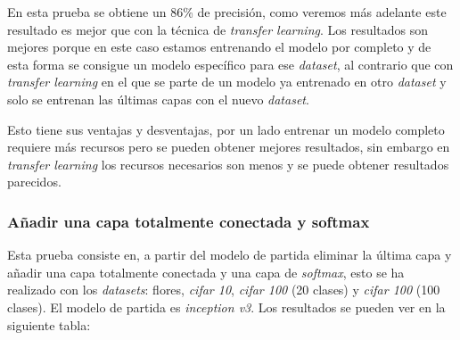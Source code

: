 \documentclass[12pt,a4paper]{article}
\begin{document}
En esta prueba se obtiene un 86\% de precisión, como veremos más adelante este resultado es mejor que con la técnica de \textit{transfer learning}. Los resultados son mejores porque en este caso estamos entrenando el modelo por completo y de esta forma se consigue un modelo específico para ese \textit{dataset}, al contrario que con \textit{transfer learning} en el que se parte de un modelo ya entrenado en otro \textit{dataset} y solo se entrenan las últimas capas con el nuevo \textit{dataset}.
\bigskip

Esto tiene sus ventajas y desventajas, por un lado entrenar un modelo completo requiere más recursos pero se pueden obtener mejores resultados, sin embargo en \textit{transfer learning} los recursos necesarios son menos y se puede obtener resultados parecidos.

\subsubsection{Añadir una capa totalmente conectada y softmax}
Esta prueba consiste en, a partir del modelo de partida eliminar la última capa y añadir una capa totalmente conectada y una capa de \textit{softmax}, esto se ha realizado con los \textit{datasets}: flores, \textit{cifar 10}, \textit{cifar 100} (20 clases) y \textit{cifar 100} (100 clases). El modelo de partida es \textit{inception v3}. Los resultados se pueden ver en la siguiente tabla:
\end{document}

